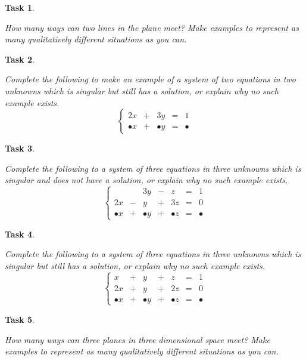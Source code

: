 \documentclass[10pt,]{book}
\theoremstyle{plain}
\numberwithin{equation}{section}
\newtheorem{task}{Task}[chapter]
\begin{document}
\begin{task}
\label{task-42}

          How many ways can two lines in the plane meet? Make examples to
          represent as many \emph{qualitatively different} situations as you can.
        \end{task}
\begin{task}
\label{task-43}

          Complete the following to make an example of a system of two equations
          in two unknowns which is singular but still has a solution, or explain why
          no such example exists.
          \[
            \left\{
            \begin{array}{ccccc}
            2x & + & 3y & = & 1 \\
            \bullet x & + & \bullet y & = & \bullet
            \end{array}\right.
          \]\end{task}
\begin{task}
\label{task-44}

          Complete the following to a system of three equations in three
          unknowns which is singular and does not have a solution, or explain
          why no such example exists.
          \[
            \left\{
            \begin{array}{ccccccc}
               &  & 3y & - & z & = & 1 \\
            2x & - & y & + & 3z & = & 0 \\
            \bullet x & + & \bullet y & + &\bullet z &  = & \bullet
            \end{array}\right.
          \]\end{task}
\begin{task}
\label{task-45}

          Complete the following to a system of three equations in three
          unknowns which is singular but still has a solution, or explain why
          no such example exists.
          \[
            \left\{
            \begin{array}{ccccccc}
            x & + & y & + & z & = & 1 \\
            2x & + & y & + & 2z & = & 0 \\
            \bullet x & + & \bullet y & + &\bullet z &  = & \bullet
            \end{array}\right.
          \]\end{task}
\begin{task}
\label{task-46}

          How many ways can three planes in three dimensional space meet? Make
          examples to represent as many \emph{qualitatively different}
          situations as you can.
        \end{task}
\clearpage
\typeout{************************************************}
\typeout{************************************************}
\end{document}

